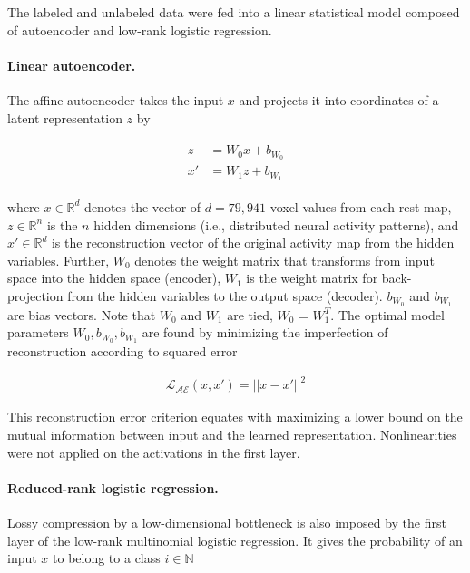 \documentclass{article} %
\begin{document}
The labeled and unlabeled data were fed into a linear statistical model
composed of autoencoder and low-rank logistic regression.

\paragraph{Linear autoencoder.}
The affine autoencoder takes the input 
$x$ and projects it into coordinates of a latent representation $z$
by

\begin{eqnarray}
  \begin{split}
  z &= W_0 x + b_{W_0} \\
  x' &= W_1 z + b_{W_1}
  \end{split}
  \label{eq:autoenc}
\end{eqnarray}

where $x \in \mathbb{R}^{d}$ denotes the vector of $d=79,941$
voxel values from each
rest map, $z \in \mathbb{R}^{n}$ is the $n$ hidden dimensions (i.e.,
distributed neural activity patterns), and 
$x' \in \mathbb{R}^{d}$ is the reconstruction vector of the original activity map
from the hidden variables. Further, ${W_0}$ denotes the weight matrix that
transforms
from input space into the hidden space (encoder),
${W_1}$ is the weight matrix for back-projection from the hidden variables to the
output space (decoder).
${b_{W_0}}$ and ${b_{W_1}}$ are bias vectors.
Note that ${W_0}$ and ${W_1}$ are tied,
$W_0$ = $W_1^T$.
The optimal model parameters ${W_0}, {b_{W_0}}, {b_{W_1}}$ are found by
minimizing the imperfection of reconstruction according to squared error

\begin{eqnarray}
  {\mathcal{L_{AE}}}(x, x') = || x - x' ||^2
\end{eqnarray}

This reconstruction error criterion equates with
maximizing a lower bound on the mutual information between
input and the learned representation.
Nonlinearities were not applied on the
activations in the first layer.

\paragraph{Reduced-rank logistic regression.}
Lossy compression by a low-dimensional bottleneck
is also imposed by the first layer of the low-rank
multinomial logistic regression.
It gives the probability of an input $x$ to belong
to a class $i \in \mathbb{N}$
\end{document}
